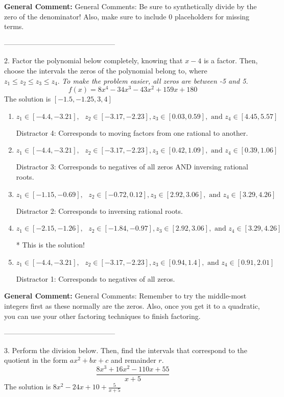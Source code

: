 \documentclass{extbook}[14pt]
\begin{document}
\textbf{General Comment:} General Comments: Be sure to synthetically divide by the zero of the denominator! Also, make sure to include 0 placeholders for missing terms. 

-----------------------------------------------

2. Factor the polynomial below completely, knowing that $x-4$ is a factor. Then, choose the intervals the zeros of the polynomial belong to, where $z_1 \leq z_2 \leq z_3 \leq z_4$. \textit{To make the problem easier, all zeros are between -5 and 5.}
\[ f(x) = 8x^{4} -34 x^{3} -43 x^{2} +159 x + 180 \] 
The solution is $ [-1.5, -1.25, 3, 4] $ 

\begin{enumerate}[label=\Alph*.] 
\item $ z_1 \in [-4.4, -3.21], \text{   }  z_2 \in [-3.17, -2.23], z_3 \in [0.03, 0.59], \text{   and   } z_4 \in [4.45, 5.57] $ 

  Distractor 4: Corresponds to moving factors from one rational to another. 
\item $ z_1 \in [-4.4, -3.21], \text{   }  z_2 \in [-3.17, -2.23], z_3 \in [0.42, 1.09], \text{   and   } z_4 \in [0.39, 1.06] $ 

  Distractor 3: Corresponds to negatives of all zeros AND inversing rational roots. 
\item $ z_1 \in [-1.15, -0.69], \text{   }  z_2 \in [-0.72, 0.12], z_3 \in [2.92, 3.06], \text{   and   } z_4 \in [3.29, 4.26] $ 

  Distractor 2: Corresponds to inversing rational roots. 
\item $ z_1 \in [-2.15, -1.26], \text{   }  z_2 \in [-1.84, -0.97], z_3 \in [2.92, 3.06], \text{   and   } z_4 \in [3.29, 4.26] $ 

 * This is the solution! 
\item $ z_1 \in [-4.4, -3.21], \text{   }  z_2 \in [-3.17, -2.23], z_3 \in [0.94, 1.4], \text{   and   } z_4 \in [0.91, 2.01] $ 

  Distractor 1: Corresponds to negatives of all zeros. 
\end{enumerate} 
 
\textbf{General Comment:} General Comments: Remember to try the middle-most integers first as these normally are the zeros. Also, once you get it to a quadratic, you can use your other factoring techniques to finish factoring. 

-----------------------------------------------

3. Perform the division below. Then, find the intervals that correspond to the quotient in the form $ax^2+bx+c$ and remainder $r$.
\[ \frac{8x^{3} +16 x^{2} -110 x + 55}{x + 5} \] 
The solution is $ 8x^{2} -24 x + 10 + \frac{5}{x + 5} $ 
\end{document}
